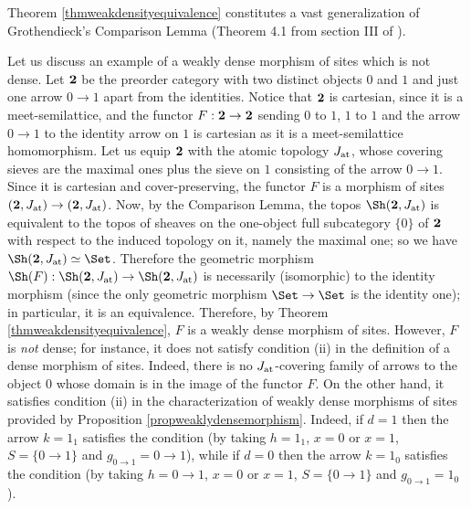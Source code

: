\documentclass[a4paper,12pt]{article}
\begin{document}
\begin{remark}
	Theorem \ref{thmweakdensityequivalence} constitutes a vast generalization of Grothendieck's Comparison Lemma (Theorem 4.1 from section III of \cite{grothendieck}).
\end{remark}

\begin{example}\label{exampleweaklydensenotdense}
Let us discuss an example of a weakly dense morphism of sites which is not dense.
Let $\bf{2}$ be the preorder category with two distinct objects $0$ and $1$ and just one arrow $0\to 1$ apart from the identities. Notice that $\bf{2}$ is cartesian, since it is a meet-semilattice, and the functor $F:\bf{2}\to \bf{2}$ sending $0$ to $1$, $1$ to $1$ and the arrow $0\to 1$ to the identity arrow on $1$ is cartesian as it is a meet-semilattice homomorphism. Let us equip $\bf{2}$ with the atomic topology $J_{\textup{at}}$, whose covering sieves are the maximal ones plus the sieve on $1$ consisting of the arrow $0\to 1$. Since it is cartesian and cover-preserving, the functor $F$ is a morphism of sites $({\mathbf{2}}, J_{\textup{at}})\to ({\mathbf{2}}, J_{\textup{at}})$. Now, by the Comparison Lemma, the topos $\Sh({\mathbf{2}}, J_{\textup{at}})$ is equivalent to the topos of sheaves on the one-object full subcategory $\{0\}$ of $\bf{2}$ with respect to the induced topology on it, namely the maximal one; so we have $\Sh({\mathbf{2}}, J_{\textup{at}})\simeq \Set$. Therefore the geometric morphism $\Sh(F):\Sh({\mathbf{2}}, J_{\textup{at}}) \to \Sh({\mathbf{2}}, J_{\textup{at}})$ is necessarily (isomorphic) to the identity morphism (since the only geometric morphism $\Set \to \Set$ is the identity one); in particular, it is an equivalence. Therefore, by Theorem \ref{thmweakdensityequivalence}, $F$ is a weakly dense morphism of sites. However, $F$ is \emph{not} dense; for instance, it does not satisfy condition (ii) in the definition of a dense morphism of sites. Indeed, there is no $J_{\textup{at}}$-covering family of arrows to the object $0$ whose domain is in the image of the functor $F$. On the other hand, it satisfies condition (ii) in the characterization of weakly dense morphisms of sites provided by Proposition \ref{propweaklydensemorphism}. Indeed, if $d=1$ then the arrow $k=1_{1}$ satisfies the condition (by taking $h=1_{1}$, $x=0$ or $x=1$, $S=\{0\to 1\}$ and $g_{0\to 1}=0\to 1$), while if $d=0$ then the arrow $k=1_{0}$ satisfies the condition (by taking $h=0\to 1$, $x=0$ or $x=1$, $S=\{0\to 1\}$ and $g_{0\to 1}=1_{0}$).
\end{example}
\end{document}
